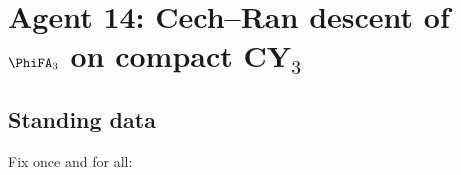 %
%
%

\chapter*{Agent 14: Cech--Ran descent of $\PhiFA_3$ on compact CY$_3$}

\section*{Standing data}

Fix once and for all:


